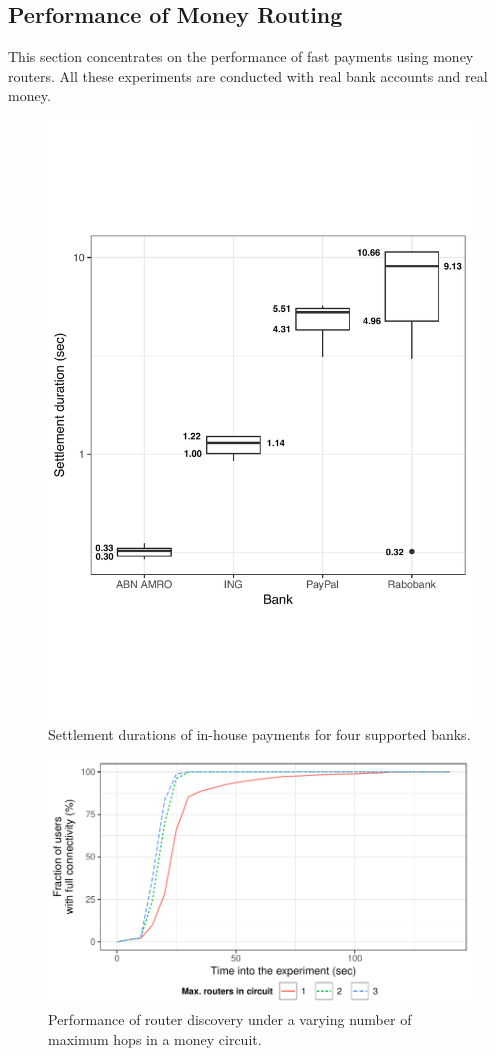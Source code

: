 \subsection{Performance of Money Routing}
This section concentrates on the performance of fast payments using money routers.
All these experiments are conducted with real bank accounts and real money.

\begin{figure}[t]
	\centering
	\includegraphics[width=.7\linewidth]{iom/assets/intrabank_annotated}
	\caption{Settlement durations of in-house payments for four supported banks.}
	\label{fig:intrabank_speed}
\end{figure}

\begin{figure}[!t]
	\centering
	\includegraphics[width=.7\linewidth]{iom/assets/router_discovery_times}
	\caption{Performance of router discovery under a varying number of maximum hops in a money circuit.}
	\label{fig:router_discovery_times}
\end{figure}

